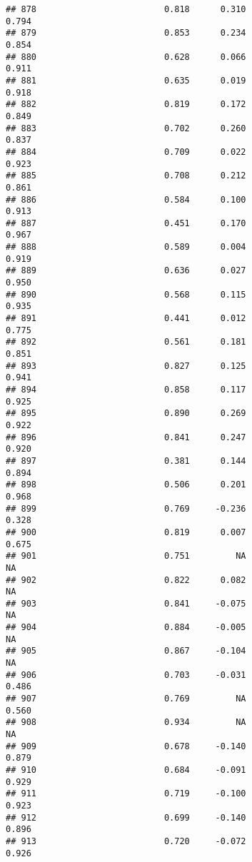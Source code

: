 \documentclass[
]{article}
\begin{document}
\begin{verbatim}
## 878                         0.818      0.310                     0.794
## 879                         0.853      0.234                     0.854
## 880                         0.628      0.066                     0.911
## 881                         0.635      0.019                     0.918
## 882                         0.819      0.172                     0.849
## 883                         0.702      0.260                     0.837
## 884                         0.709      0.022                     0.923
## 885                         0.708      0.212                     0.861
## 886                         0.584      0.100                     0.913
## 887                         0.451      0.170                     0.967
## 888                         0.589      0.004                     0.919
## 889                         0.636      0.027                     0.950
## 890                         0.568      0.115                     0.935
## 891                         0.441      0.012                     0.775
## 892                         0.561      0.181                     0.851
## 893                         0.827      0.125                     0.941
## 894                         0.858      0.117                     0.925
## 895                         0.890      0.269                     0.922
## 896                         0.841      0.247                     0.920
## 897                         0.381      0.144                     0.894
## 898                         0.506      0.201                     0.968
## 899                         0.769     -0.236                     0.328
## 900                         0.819      0.007                     0.675
## 901                         0.751         NA                        NA
## 902                         0.822      0.082                        NA
## 903                         0.841     -0.075                        NA
## 904                         0.884     -0.005                        NA
## 905                         0.867     -0.104                        NA
## 906                         0.703     -0.031                     0.486
## 907                         0.769         NA                     0.560
## 908                         0.934         NA                        NA
## 909                         0.678     -0.140                     0.879
## 910                         0.684     -0.091                     0.929
## 911                         0.719     -0.100                     0.923
## 912                         0.699     -0.140                     0.896
## 913                         0.720     -0.072                     0.926

\end{verbatim}
\end{document}
